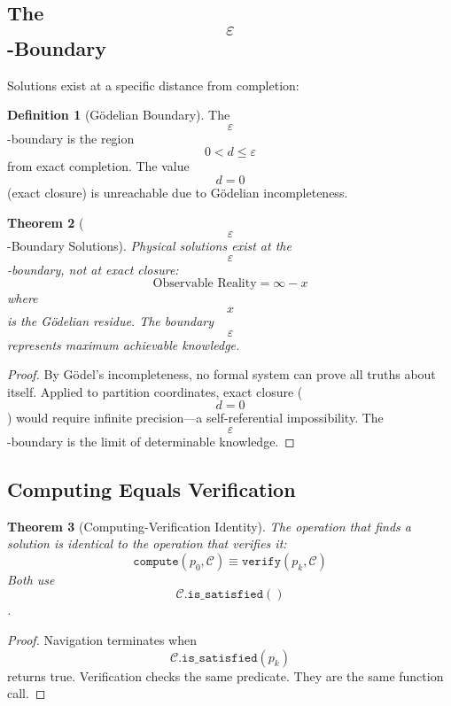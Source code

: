 \documentclass[11pt,twocolumn,a4paper]{article}
\newtheorem{theorem}{Theorem}[section]
\theoremstyle{definition}
\newtheorem{definition}[theorem]{Definition}
\theoremstyle{remark}
\begin{document}
\subsection{The $$\varepsilon$$-Boundary}

Solutions exist at a specific distance from completion:

\begin{definition}[G\"{o}delian Boundary]
The $$\varepsilon$$-boundary is the region $$0 < d \leq \varepsilon$$ from exact completion. The value $$d = 0$$ (exact closure) is unreachable due to G\"{o}delian incompleteness.
\end{definition}

\begin{theorem}[$$\varepsilon$$-Boundary Solutions]
\label{thm:epsilon}
Physical solutions exist at the $$\varepsilon$$-boundary, not at exact closure:
\begin{equation}
\text{Observable Reality} = \infty - x
\end{equation}
where $$x$$ is the G\"{o}delian residue. The boundary $$\varepsilon$$ represents maximum achievable knowledge.
\end{theorem}

\begin{proof}
By G\"{o}del's incompleteness, no formal system can prove all truths about itself. Applied to partition coordinates, exact closure ($$d = 0$$) would require infinite precision---a self-referential impossibility. The $$\varepsilon$$-boundary is the limit of determinable knowledge.
\end{proof}

\subsection{Computing Equals Verification}

\begin{theorem}[Computing-Verification Identity]
\label{thm:computing_verification}
The operation that finds a solution is identical to the operation that verifies it:
\begin{equation}
\texttt{compute}(p_0, \mathcal{C}) \equiv \texttt{verify}(p_k, \mathcal{C})
\end{equation}
Both use $$\mathcal{C}.\texttt{is\_satisfied}()$$.
\end{theorem}

\begin{proof}
Navigation terminates when $$\mathcal{C}.\texttt{is\_satisfied}(p_k)$$ returns true. Verification checks the same predicate. They are the same function call.
\end{proof}
\end{document}
